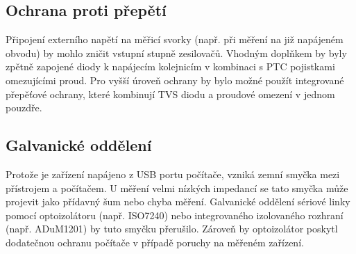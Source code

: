 \subsection{Ochrana proti přepětí}

Připojení externího napětí na měřicí svorky (např. při měření na již napájeném obvodu) 
by mohlo zničit vstupní stupně zesilovačů. Vhodným doplňkem by byly zpětně zapojené diody 
k napájecím kolejnicím v kombinaci s PTC pojistkami omezujícími proud. 
Pro vyšší úroveň ochrany by bylo možné použít integrované přepěťové ochrany, 
které kombinují TVS diodu a proudové omezení v jednom pouzdře.

\subsection{Galvanické oddělení}

Protože je zařízení napájeno z USB portu počítače, vzniká zemní smyčka mezi přístrojem a 
počítačem. U měření velmi nízkých impedancí se tato smyčka může projevit 
jako přídavný šum nebo chyba měření. Galvanické oddělení sériové linky pomocí optoizolátoru 
(např. ISO7240) nebo integrovaného izolovaného rozhraní (např. ADuM1201) 
by tuto smyčku přerušilo. Zároveň by optoizolátor poskytl dodatečnou ochranu počítače 
v případě poruchy na měřeném zařízení.

